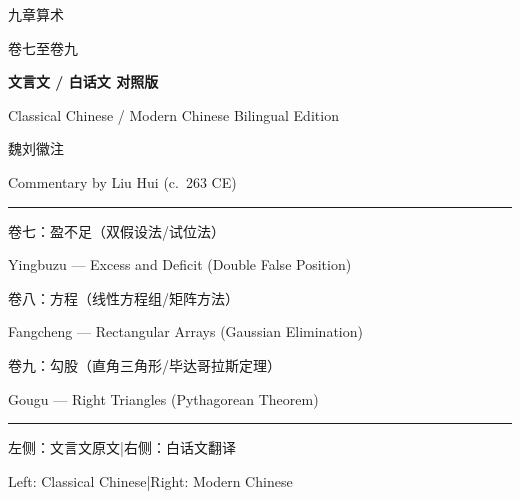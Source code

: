 \documentclass[10pt,a4paper]{article}
\begin{document}
\thispagestyle{empty}
\begin{center}
\vspace*{2cm}

{\fontsize{36}{44}\selectfont\color{titlecolor} 九章算术}

\vspace{0.8cm}

{\fontsize{18}{22}\selectfont\color{volcolor} 卷七至卷九}

\vspace{1.5cm}

{\LARGE\bfseries\color{sectioncolor} 文言文 / 白话文 对照版}

\vspace{0.5cm}

{\large Classical Chinese / Modern Chinese Bilingual Edition}

\vspace{2cm}

{\Large\color{sectioncolor} 魏\quad 刘徽\quad 注}

\vspace{0.3cm}

{\large Commentary by Liu Hui (c.~263 CE)}

\vspace{2cm}

\rule{0.5\textwidth}{1pt}

\vspace{0.8cm}

{\large 卷七：盈不足（双假设法/试位法）}

{\normalsize Yingbuzu --- Excess and Deficit (Double False Position)}

\vspace{0.3cm}

{\large 卷八：方程（线性方程组/矩阵方法）}

{\normalsize Fangcheng --- Rectangular Arrays (Gaussian Elimination)}

\vspace{0.3cm}

{\large 卷九：勾股（直角三角形/毕达哥拉斯定理）}

{\normalsize Gougu --- Right Triangles (Pythagorean Theorem)}

\vspace{2cm}

\rule{0.5\textwidth}{0.4pt}

\vspace{0.5cm}

{\small 左侧：文言文原文\quad |\quad 右侧：白话文翻译}

{\small Left: Classical Chinese\quad |\quad Right: Modern Chinese}

\end{center}
\end{document}
